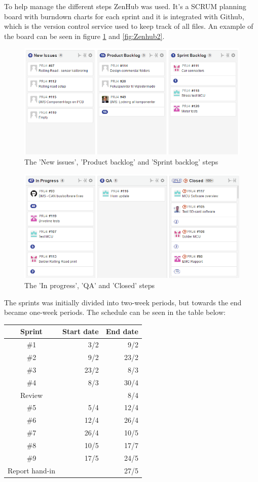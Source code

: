 To help manage the different steps ZenHub\cite{Zenhub} was used. It's a SCRUM planning board with burndown charts for each sprint and it is integrated with Github\cite{Github}, which is the version control service used to keep track of all files. An example of the board can be seen in figure \ref{fig:Zenhub1} and \vref{fig:Zenhub2}.

\begin{figure}
	\centering
	\includegraphics[width=0.7\linewidth]{SubPages/Images/Zenhub1}
	\caption{The 'New issues', 'Product backlog' and 'Sprint backlog' steps}
	\label{fig:Zenhub1}
\end{figure}

\begin{figure}
	\centering
	\includegraphics[width=0.7\linewidth]{SubPages/Images/Zenhub2}
	\caption{The 'In progress', 'QA' and 'Closed' steps}
	\label{fig:Zenhub2}
\end{figure}

The sprints was initially divided into two-week periods, but towards the end became one-week periods. The schedule can be seen in the table below:

\begin{tabular}{|c|r|r|}
	\hline \textbf{Sprint} & \textbf{Start date} & \textbf{End date} \\ 
	\hline \#1 & 3/2 & 9/2 \\ 
	\hline \#2 & 9/2 & 23/2 \\ 
	\hline \#3 & 23/2 & 8/3 \\ 
	\hline \#4 & 8/3 & 30/4 \\ 
	\hline Review & & 8/4 \\
	\hline \#5 & 5/4 & 12/4 \\ 
	\hline \#6 & 12/4 & 26/4 \\ 
	\hline \#7 & 26/4 & 10/5 \\ 
	\hline \#8 & 10/5 & 17/7 \\ 
	\hline \#9 & 17/5 & 24/5 \\ 
	\hline Report hand-in &  & 27/5 \\ 
	\hline 
\end{tabular} 

